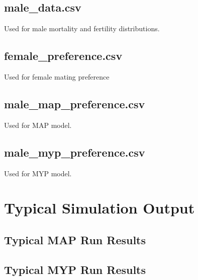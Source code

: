 \documentclass[authoryearcitations]{UoYCSproject}
\begin{document}
\section{male\_data.csv}
Used for male mortality and fertility distributions.

\section{female\_preference.csv}
Used for female mating preference

\section{male\_map\_preference.csv}
Used for MAP model.

\section{male\_myp\_preference.csv}
Used for MYP model.

\chapter{Typical Simulation Output}
\label{adx:typicalSimulationOutput}
\section{Typical MAP Run Results}


\section{Typical MYP Run Results}
\end{document}
